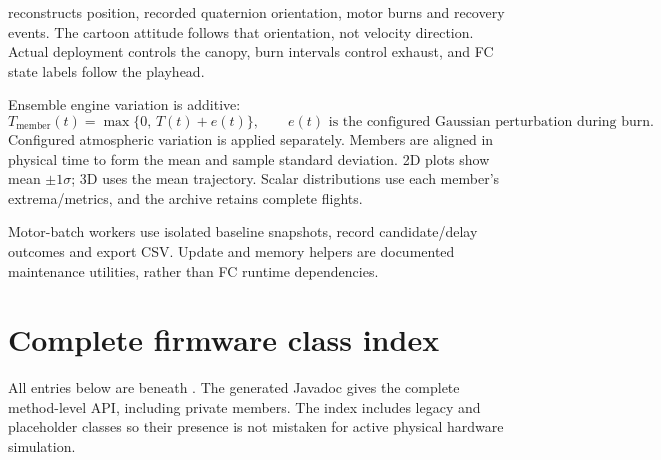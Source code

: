  reconstructs position, recorded quaternion orientation,
motor burns and recovery events. The cartoon attitude follows that orientation,
not velocity direction. Actual deployment controls the canopy, burn intervals
control exhaust, and FC state labels follow the playhead.

Ensemble engine variation is additive:
\begin{equation}
 T_{\mathrm{member}}(t)=\max\{0,\,T(t)+e(t)\},
 \qquad e(t)\text{ is the configured Gaussian perturbation during burn}.
\end{equation}
Configured atmospheric variation is applied separately. Members are aligned
in physical time to form the mean and sample standard deviation. 2D plots
show mean \(\pm1\sigma\); 3D uses the mean trajectory. Scalar distributions
use each member's extrema/metrics, and the archive retains complete flights.

Motor-batch workers use isolated baseline snapshots, record candidate/delay
outcomes and export CSV. Update and memory helpers are documented maintenance
utilities, rather than FC runtime dependencies.

\clearpage
\section{Complete firmware class index}
All entries below are beneath . The generated
Javadoc gives the complete method-level API, including private members.
The index includes legacy and placeholder classes so their presence is not
mistaken for active physical hardware simulation.

